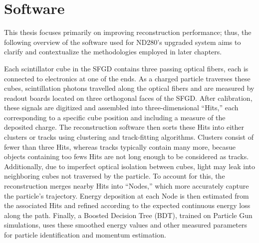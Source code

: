 \section{Software}
\label{sec:t2k-sw}
This thesis focuses primarily on improving reconstruction performance; thus, the following overview of the software used for ND280’s upgraded system aims to clarify and contextualize the methodologies employed in later chapters.

Each scintillator cube in the SFGD contains three passing optical fibers, each is connected to electronics at one of the ends. 
As a charged particle traverses these cubes, scintillation photons travelled along the optical fibers and are measured by readout boards located on three orthogonal faces of the SFGD.  
After calibration, these signals are digitized and assembled into three-dimensional “Hits,” each corresponding to a specific cube position and including a measure of the deposited charge.  
The reconstruction software then sorts these Hits into either clusters or tracks using clustering and track-fitting algorithms.  
Clusters consist of fewer than three Hits, whereas tracks typically contain many more, becasue objects containing too fews Hits are not long enough to be considered as tracks. 
Additionally, due to imperfect optical isolation between cubes, light may leak into neighboring cubes not traversed by the particle.  
To account for this, the reconstruction merges nearby Hits into “Nodes,” which more accurately capture the particle’s trajectory.  
Energy deposition at each Node is then estimated from the associated Hits and refined according to the expected continuous energy loss along the path.  
Finally, a Boosted Decision Tree (BDT), trained on Particle Gun simulations, uses these smoothed energy values and other measured parameters for particle identification and momentum estimation.  